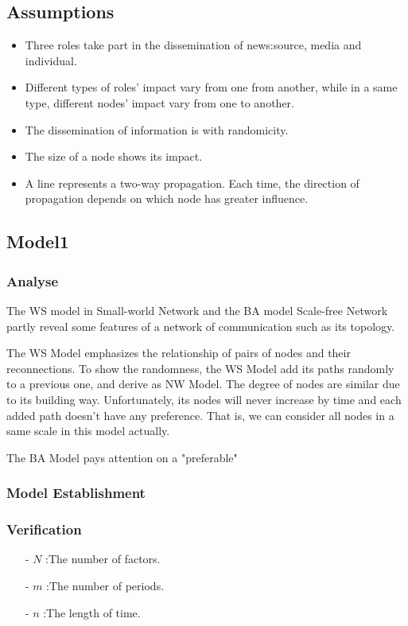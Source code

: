 \subsection{Assumptions}
\begin{itemize}
	\item Three roles take part in the dissemination of news:source, media and individual.
	\item Different types of roles' impact vary from one from another, while in a same type, different nodes' impact vary from one to another.
	\item The dissemination of information is with randomicity.
	\item The size of a node shows its impact.
	\item A line represents a two-way propagation. Each time, the direction of propagation depends on which node has greater influence.
\end{itemize}

\subsection{Model1}
\subsubsection*{Analyse}
\par The WS model in Small-world Network and the BA model Scale-free Network partly reveal some features of a network of communication such as its topology.
\par The WS Model emphasizes the relationship of pairs of nodes and their reconnections. To show the randomness, the WS Model add its paths randomly to a previous one, and derive as NW Model. The degree of nodes are similar due to its building way. Unfortunately, its nodes will never increase by time and each added path doesn't have any preference. That is, we can consider all nodes in a same scale in this model actually.  

\par The BA Model pays attention on a "preferable" 
\subsubsection*{Model Establishment}
\subsubsection*{Verification}
\begin{itemize}
	\item[-] $N$ :The number of factors.
	\item[-] $m$ :The number of periods.
	\item[-] $n$ :The length of time.
\end{itemize}

